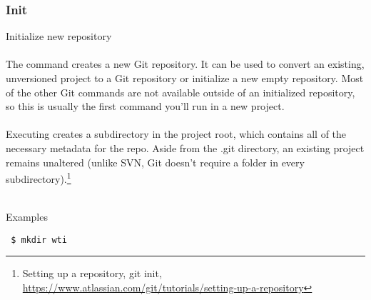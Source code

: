 
\subsubsection{Init}
Initialize new repository
\\
\\
The  command creates a new Git repository.  It can be
used to convert an existing, unversioned project to a Git
repository or initialize a new empty repository. Most of the other
Git commands are not available outside of an initialized
repository, so this is usually the first command you’ll run in a
new project.
\\
\\
Executing  creates a  subdirectory in the
project root, which contains all of the necessary metadata for the
repo. Aside from the .git directory, an existing project remains
unaltered (unlike SVN, Git doesn't require a  folder in
every subdirectory).\footnote{Setting up a repository, git init,\\
\href{https://www.atlassian.com/git/tutorials/setting-up-a-repository}
{https://www.atlassian.com/git/tutorials/setting-up-a-repository}}
\\
\\
\begin{bf}Examples\end{bf}

\begin{Verbatim}
 $ mkdir wti
\end{Verbatim}


